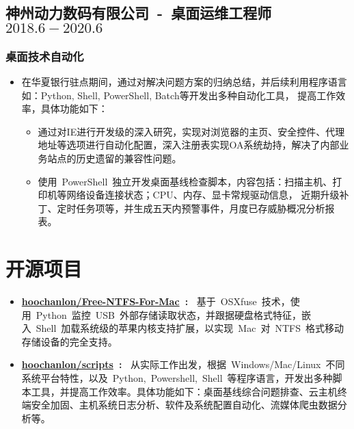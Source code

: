 \documentclass[a4paper,12pt]{article}
\newcommand{\mydash}{
    \noindent\makebox[16cm]{
        \textcolor{gray!70}{
            \hdashrule{16cm}{2.5pt}{2.5pt}
        }
    }
    \vspace{-7ex}
}
\begin{document}
\begin{CJK*}{UTF8}{gbsn}
        \subsection*{神州动力数码有限公司~-~桌面运维工程师 \hfill  $2018.6-2020.6$}
        \subsubsection*{桌面技术自动化}
        \begin{itemize}
            \item[]
        {在华夏银行驻点期间，通过对解决问题方案的归纳总结，并后续利用程序语言如：Python, Shell, PowerShell, Batch等开发出多种自动化工具，
        提高工作效率，具体功能如下：
        \begin{itemize}
            \item {通过对IE进行开发级的深入研究，实现对浏览器的主页、安全控件、代理地址等选项进行自动化配置，深入注册表实现OA系统劫持，解决了内部业务站点的历史遗留的兼容性问题。}
            \item {使用~PowerShell~独立开发桌面基线检查脚本，内容包括：扫描主机、打印机等网络设备连接状态；CPU、内存、显卡常规驱动信息，
            近期升级补丁、定时任务项等，并生成五天内预警事件，月度已存威胁概况分析报表。}
        \end{itemize}
        }
        \end{itemize}

        \mydash
        \section*{\textcolor{red!50!brown}{开源项目}}
        \begin{itemize}
            \item \textbf{\href{https://github.com/hoochanlon/Free-NTFS-For-Mac}{hoochanlon/Free-NTFS-For-Mac}~:~}
            {基于~OSXfuse~技术，使用~Python~监控~USB~外部存储读取状态，并跟据硬盘格式特征，嵌入~Shell~加载系统级的苹果内核支持扩展，以实现~Mac~对~NTFS~格式移动存储设备的完全支持。}

            \item \textbf{\href{https://github.com/hoochanlon/scripts}{hoochanlon/scripts}~:~}
            {从实际工作出发，根据~Windows/Mac/Linux~不同系统平台特性，以及~Python,~Powershell,~Shell~等程序语言，开发出多种脚本工具，并提高工作效率。具体功能如下：桌面基线综合问题排查、云主机终端安全加固、主机系统日志分析、软件及系统配置自动化、流媒体爬虫数据分析等。}



\end{itemize}
\end{CJK*}
\end{document}

